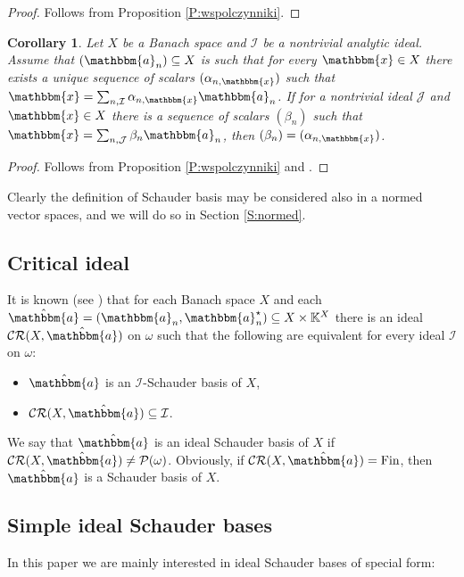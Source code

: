 \documentclass{amsart}
\newcommand{\IK}{\mathbb{K}}
\newcommand{\I}{\mathcal{I}}
\newcommand{\J}{\mathcal{J}}
\newcommand{\Fin}{\mathrm{Fin}}
\newcommand{\CR}{\mathcal{CR}}
\newcommand{\w}{\mathbbm}
\newtheorem{corollary}[theorem]{Corollary}
\begin{document}
\begin{proof}
Follows from Proposition \ref{P:wspolczynniki}.
\end{proof}

\begin{corollary}
Let $X$ be a Banach space and $\I$ be a nontrivial analytic ideal. Assume that $(\w{a}_n)\subseteq X$ is such that for every $\w{x}\in X$ there exists a unique sequence of scalars $(\alpha_{n,\w{x}})$ such that $\w{x}=\sum_{n,\I}\alpha_{n,\w{x}} \w{a}_n$. If for a nontrivial ideal $\J$ and $\w{x}\in X$ there is a sequence of scalars $(\beta_n)$ such that $\w{x}=\sum_{n,\J}\beta_n \w{a}_n$, then $(\beta_n)=(\alpha_{n,\w{x}})$.
\end{corollary}

\begin{proof}
Follows from Proposition \ref{P:wspolczynniki} and \cite[Theorem A]{RKS}.
\end{proof}


Clearly the definition of Schauder basis may be considered also in a normed vector spaces, and we will do so in Section \ref{S:normed}.

\subsection{Critical ideal}

It is known (see \cite[Proof of Theorem B]{RKS}) that for each Banach space $X$ and each $\hat{\w{a}}=(\w{a}_n,\w{a}^\star_n)\subseteq X\times \IK^X$ there is an ideal $\CR(X,\hat{\w{a}})$ on $\omega$ such that the following are equivalent for every ideal $\I$ on $\omega$:
\begin{itemize}
    \item $\hat{\w{a}}$ is an $\I$-Schauder basis of $X$,
    \item $\CR(X,\hat{\w{a}})\subseteq\I$.
\end{itemize}
We say that $\hat{\w{a}}$ is an ideal Schauder basis of $X$ if $\CR(X,\hat{\w{a}})\neq\mathcal{P}(\omega)$. Obviously, if $\CR(X,\hat{\w{a}})=\Fin$, then $\hat{\w{a}}$ is a Schauder basis of $X$.

\subsection{Simple ideal Schauder bases}

In this paper we are mainly interested in ideal Schauder bases of special form:
\end{document}
